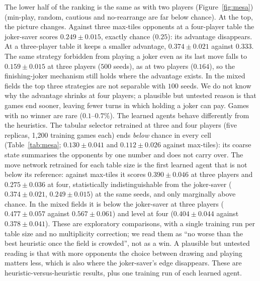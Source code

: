 \documentclass[11pt]{article}
\begin{document}
The lower half of the ranking is the same as with two players (Figure~\ref{fig:mesa}) (min-play, random, cautious and no-rearrange are far below chance). At the top, the picture changes. Against three max-tiles opponents at a four-player table the joker-saver scores $0.249\pm0.015$, exactly chance ($0.25$): its advantage disappears. At a three-player table it keeps a smaller advantage, $0.374\pm0.021$ against $0.333$. The same strategy forbidden from playing a joker even as its last move falls to $0.159\pm0.015$ at three players ($500$ seeds), as at two players ($0.164$), so the finishing-joker mechanism still holds where the advantage exists. In the mixed fields the top three strategies are not separable with $100$ seeds. We do not know why the advantage shrinks at four players; a plausible but untested reason is that games end sooner, leaving fewer turns in which holding a joker can pay. Games with no winner are rare ($0.1$--$0.7\%$). The learned agents behave differently from the heuristics. The tabular selector retrained at three and four players (five replicas, 1{,}200 training games each) ends \emph{below} chance in every cell (Table~\ref{tab:mesa}; $0.130\pm0.041$ and $0.112\pm0.026$ against max-tiles): its coarse state summarises the opponents by one number and does not carry over. The move network retrained for each table size is the first learned agent that is not below its reference: against max-tiles it scores $0.390\pm0.046$ at three players and $0.275\pm0.036$ at four, statistically indistinguishable from the joker-saver ($0.374\pm0.021$, $0.249\pm0.015$) at the same seeds, and only marginally above chance. In the mixed fields it is below the joker-saver at three players ($0.477\pm0.057$ against $0.567\pm0.061$) and level at four ($0.404\pm0.044$ against $0.378\pm0.041$). These are exploratory comparisons, with a single training run per table size and no multiplicity correction; we read them as ``no worse than the best heuristic once the field is crowded'', not as a win. A plausible but untested reading is that with more opponents the choice between drawing and playing matters less, which is also where the joker-saver's edge disappears. These are heuristic-versus-heuristic results, plus one training run of each learned agent.
\end{document}
